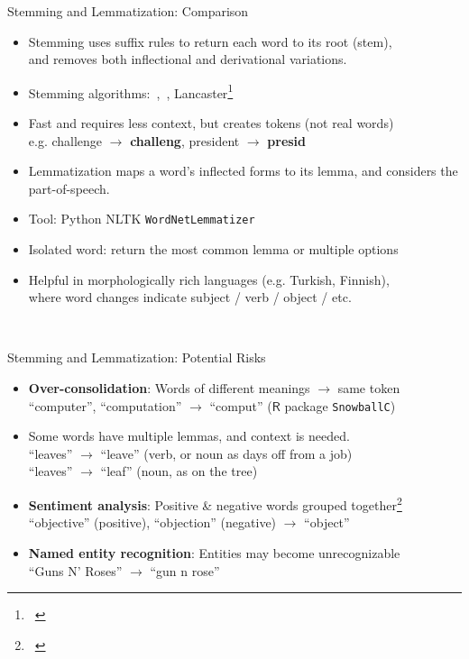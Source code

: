 \documentclass{beamer}
\renewcommand{\cite}{\citep}
\begin{document}
\begin{frame}{Stemming and Lemmatization: Comparison}
\begin{itemize}
\item Stemming uses suffix rules to return each word to its root (stem),\\
	and removes both inflectional and derivational variations.
\item Stemming algorithms:~\citet{porter1980algorithm},~\citet{lovins1968development}, Lancaster\footnote{~\cite{paice2005lancaster}}
\item Fast and requires less context, but creates tokens (not real words)\\
	e.g. challenge $\rightarrow$ \textbf{challeng}, president $\rightarrow$ \textbf{presid}
	\bigskip
\item Lemmatization maps a word's inflected forms to its lemma, and considers the part-of-speech.~\cite{bergmanis2018context}
\item Tool: Python NLTK \texttt{WordNetLemmatizer}
\item Isolated word: return the most common lemma or multiple options
\item Helpful in morphologically rich languages (e.g. Turkish, Finnish),\\
	where word changes indicate subject / verb / object / etc.
	\vspace{-2.5pt}
	\begin{flushright}
	~\cite{tsarfaty2010statistical}
	\end{flushright}
\end{itemize}
\end{frame}

\begin{frame}{Stemming and Lemmatization: Potential Risks}
\begin{itemize}
\item\textbf{Over-consolidation}: Words of different meanings $\rightarrow$ same token\\
	``computer'', ``computation'' $\rightarrow$ ``comput'' ($\mathsf{R}$ package \texttt{SnowballC})
\item Some words have multiple lemmas, and context is needed.\\
	``leaves'' $\rightarrow$ ``leave'' (verb, or noun as days off from a job)\\
	``leaves'' $\rightarrow$ ``leaf'' (noun, as on the tree)
	\bigskip
\item\textbf{Sentiment analysis}: Positive \& negative words grouped together\footnote{~\cite{ghazvinian2011star}}\\
	``objective'' (positive), ``objection'' (negative) $\rightarrow$ ``object''
\item\textbf{Named entity recognition}: Entities may become unrecognizable\\
	``Guns N' Roses'' $\rightarrow$ ``gun n rose''~\cite{cambria2017sentiment}
\end{itemize}
\end{frame}
\end{document}
